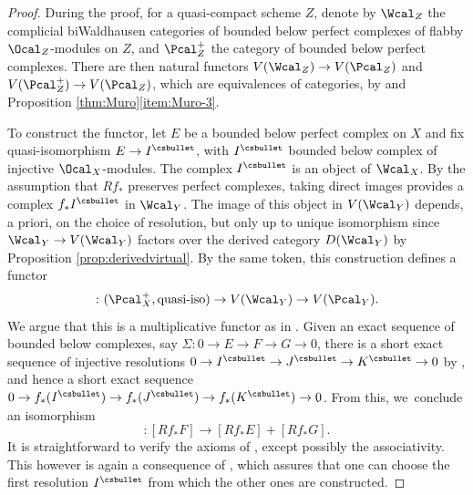 \begin{proof}
During the proof, for a quasi-compact scheme $Z$, denote by $\Wcal_{Z}$ the complicial biWaldhausen categories of bounded below perfect complexes of flabby $\Ocal_{Z}$\nobreakdash-mod\-ules on $Z$, and $\Pcal^+_Z$ the category of bounded below perfect complexes. There are then natural functors $V(\Wcal_{Z}) \to V(\Pcal_Z)$ and $V(\Pcal^+_Z) \to V(\Pcal_Z)$, which are equivalences of categories, by \cite[Lem.\,3.5]{ThomasonTrobaugh} and Proposition \ref{thm:Muro}\eqref{item:Muro-3}.

To construct the functor, let $E$ be a bounded below perfect complex on $X$ and fix quasi-isomorphism $E\to I^{\csbullet}$, with $I^{\csbullet}$ bounded below complex of injective $\Ocal_X$\nobreakdash-mod\-ules. The complex $I^{\csbullet}$ is an object of $\Wcal_{X}$. By the assumption that $Rf_{\ast}$ preserves perfect complexes, taking direct images provides a complex $f_\ast I^{\csbullet}$ in $\Wcal_Y$. The image of this object in $V(\Wcal_Y)$ depends, a priori, on the choice of resolution, but only up to unique isomorphism since $\Wcal_{Y}\to V(\Wcal_{Y})$ factors over the derived category $D(\Wcal_Y)$ by Proposition \ref{prop:derivedvirtual}. By the same token, this construction defines a functor
\begin{displaymath}
[Rf_{\ast}(\cdot)]\colon (\Pcal^+_{X},\hbox{quasi-iso})\to V(\Wcal_Y) \to V(\Pcal_Y).
\end{displaymath}
We argue that this is a multiplicative functor as in \cite[Def.\,1.2.3]{Muro:determinant}. Given an exact sequence of bounded below complexes, say $\Sigma: 0 \to E \to F \to G \to 0$, there is a short exact sequence of injective resolutions $0 \to I^{\csbullet} \to J^{\csbullet} \to K^{\csbullet} \to 0$ by \cite[\href{https://stacks.math.columbia.edu/tag/013T}{013T}]{stacks-project}, and hence a short exact sequence $0 \to f_\ast (I^{\csbullet}) \to f_\ast (J^{\csbullet}) \to f_\ast (K^{\csbullet}) \to 0$. From this, we~conclude an isomorphism
\begin{displaymath}
[\Sigma]: [Rf_\ast F] \to [Rf_\ast E] + [Rf_\ast G].
\end{displaymath}
It is straightforward to verify the axioms of \cite[Def.\,1.2.3]{Muro:determinant}, except possibly the associativity. This however is again a consequence of \cite[\href{https://stacks.math.columbia.edu/tag/013T}{013T}]{stacks-project}, which assures that one can choose the first resolution $I^{\csbullet}$ from which the other ones are constructed.


\end{proof}
